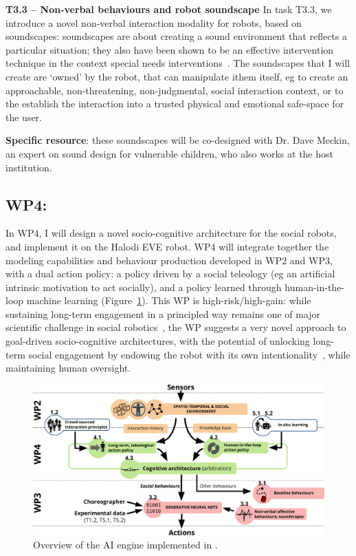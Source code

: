 \textbf{T3.3 -- Non-verbal behaviours and robot soundscape} In task T3.3, we
introduce a novel non-verbal interaction modality for robots, based on
soundscapes: soundscapes are about creating a sound environment that reflects a
particular situation; they also have been shown to be an effective intervention
technique in the context special needs
interventions~\cite{greher2010soundscape}. The soundscapes that I will create
are `owned' by the robot, that can manipulate ithem itself, eg to create an
approachable, non-threatening, non-judgmental, social interaction context, or to
the establish the interaction into a trusted physical and emotional safe-space
for the user.

\textbf{Specific resource}: these soundscapes will be co-designed with Dr.
Dave Meckin, an expert on sound design for vulnerable children, who also works
at the host institution.

\subsection{WP4: \textbf{\wpFour}}

In WP4, I will design a novel socio-cognitive architecture for the social
robots, and implement it on the Halodi EVE robot.  WP4 will integrate together the
modeling capabilities and behaviour production developed in WP2 and WP3, with a
dual action policy: a policy driven by a social teleology (eg an artificial
intrinsic motivation to act socially), and a policy learned through
human-in-the-loop machine learning (Figure~\ref{fig:archi}). This WP is high-risk/high-gain: while sustaining
long-term engagement in a principled way remains one of major scientific
challenge in social robotics~\cite{hoffman2019anki}, the WP suggests a very novel
approach to goal-driven socio-cognitive architectures, with the potential of
unlocking long-term social engagement by endowing the robot with its own
intentionality~\cite{wiese2017robots}, while maintaining human oversight.

\begin{figure}[h!]
\centering
\includegraphics[width=0.8\linewidth]{figs/archi}
\caption{Overview of the AI engine implemented in \project.}
\label{fig:archi}
\end{figure}


